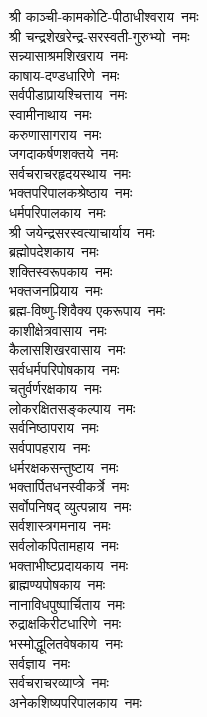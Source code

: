 \begin{flushleft}
\begin{multicols}{2}
श्री काञ्ची-कामकोटि-पीठाधीश्वराय~नमः\\
श्री चन्द्रशेखरेन्द्र-सरस्वती-गुरुभ्यो~नमः\\
सन्न्यासाश्रमशिखराय~नमः\\
काषाय-दण्डधारिणे~नमः\\
सर्वपीडाप्रायश्चित्ताय~नमः\\
स्वामीनाथाय~नमः\\
करुणासागराय~नमः\\
जगदाकर्षणशक्तये~नमः\\
सर्वचराचरहृदयस्थाय~नमः\\
भक्तपरिपालकश्रेष्ठाय~नमः\hfill{}\\
धर्मपरिपालकाय~नमः\\
श्री जयेन्द्रसरस्वत्याचार्याय~नमः\\
ब्रह्मोपदेशकाय~नमः\\
शक्तिस्वरूपकाय~नमः\\
भक्तजनप्रियाय~नमः\\
ब्रह्म-विष्णु-शिवैक्य एकरूपाय~नमः\\
काशीक्षेत्रवासाय~नमः\\
कैलासशिखरवासाय~नमः\\
सर्वधर्मपरिपोषकाय~नमः\\
चतुर्वर्णरक्षकाय~नमः\hfill{}\\
लोकरक्षितसङ्कल्पाय~नमः\\
सर्वनिष्ठापराय~नमः\\
सर्वपापहराय~नमः\\
धर्मरक्षकसन्तुष्टाय~नमः\\
भक्तार्पितधनस्वीकर्त्रे~नमः\\
सर्वोपनिषद् व्युत्पन्नाय~नमः\\
सर्वशास्त्रगमनाय~नमः\\
सर्वलोकपितामहाय~नमः\\
भक्ताभीष्टप्रदायकाय~नमः\\
ब्राह्मण्यपोषकाय~नमः\hfill{}\\
नानाविधपुष्पार्चिताय~नमः\\
रुद्राक्षकिरीटधारिणे~नमः\\
भस्मोद्धूलितवेषकाय~नमः\\
सर्वज्ञाय~नमः\\
सर्वचराचरव्याप्त्रे~नमः\\
अनेकशिष्यपरिपालकाय~नमः\\

\end{multicols}
\end{flushleft}
